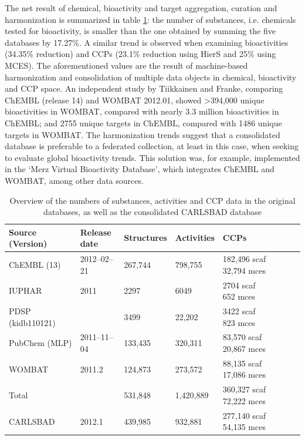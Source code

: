 The net result of chemical, bioactivity and target aggregation, curation and harmonization is summarized in table \ref{tab:cb_02}: the number of substances, i.e. chemicals tested for bioactivity, is smaller than the one obtained by summing the five databases by 17.27\%. A similar trend is observed when examining bioactivities (34.35\% reduction) and CCPs (23.1\% reduction using HierS and 25\% using MCES). The aforementioned values are the result of machine-based harmonization and consolidation of multiple data objects in chemical, bioactivity and CCP space. An independent study by Tiikkainen and Franke\cite{Tiikkainen2013-md,UniProt_Consortium2018-kq}, comparing ChEMBL (release 14) and WOMBAT 2012.01, showed \textgreater 394,000 unique bioactivities in WOMBAT, compared with nearly 3.3 million bioactivities in ChEMBL; and 2755 unique targets in ChEMBL, compared with 1486 unique targets in WOMBAT. The harmonization trends suggest that a consolidated database is preferable to a federated collection, at least in this case, when seeking to evaluate global bioactivity trends. This solution was, for example, implemented in the ‘Merz Virtual Bioactivity Database’, which integrates ChEMBL and WOMBAT, among other data sources.

\begin{table}[]
\caption{Overview of the numbers of substances, activities and CCP data in the original databases, as well as the consolidated CARLSBAD database}
\label{tab:cb_02}
\centering
\begin{tabular}{p{0.25\linewidth}p{0.15\linewidth}p{0.15\linewidth}p{0.15\linewidth}p{0.30\linewidth}}
\hline
\textbf{Source (Version)} & \textbf{Release date} & \textbf{Structures} & \textbf{Activities} & \textbf{CCPs} \\
\hline
ChEMBL (13) & 2012–02–21 & 267,744 & 798,755 & \makecell[l]{182,496 scaf \\ 32,794 mces} \\
IUPHAR & 2011 & 2297 & 6049 & \makecell[l]{2704 scaf \\ 652 mces} \\
PDSP (kidb110121) & & 3499 & 22,202 & \makecell[l]{3422 scaf \\ 823 mces} \\
PubChem (MLP) & 2011–11–04 & 133,435 & 320,311 & \makecell[l]{83,570 scaf \\ 20,867 mces} \\
WOMBAT & 2011.2 & 124,873  & 273,572 & \makecell[l]{88,135 scaf \\ 17,086 mces} \\
\hline
Total & & 531,848 & 1,420,889 & \makecell[l]{360,327 scaf \\ 72,222 mces} \\
\hline
CARLSBAD & 2012.1 & 439,985 & 932,881 & \makecell[l]{277,140 scaf \\ 54,135 mces} \\
\hline
\end{tabular}
\end{table}

